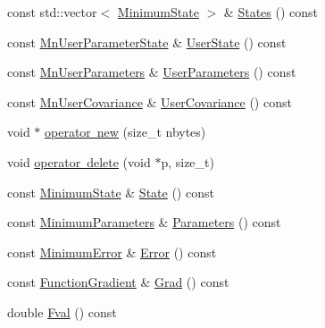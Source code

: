 \begin{DoxyCompactItemize}
\item 
const std\+::vector$<$ \mbox{\hyperlink{classROOT_1_1Minuit2_1_1MinimumState}{Minimum\+State}} $>$ \& \mbox{\hyperlink{classROOT_1_1Minuit2_1_1BasicFunctionMinimum_a89080776340dc1cad0d73357a6c4b401}{States}} () const
\item 
const \mbox{\hyperlink{classROOT_1_1Minuit2_1_1MnUserParameterState}{Mn\+User\+Parameter\+State}} \& \mbox{\hyperlink{classROOT_1_1Minuit2_1_1BasicFunctionMinimum_ac1757a094afe32c23b548fafaff5acc1}{User\+State}} () const
\item 
const \mbox{\hyperlink{classROOT_1_1Minuit2_1_1MnUserParameters}{Mn\+User\+Parameters}} \& \mbox{\hyperlink{classROOT_1_1Minuit2_1_1BasicFunctionMinimum_aa6fa4f1678939015849b6a2ab6023238}{User\+Parameters}} () const
\item 
const \mbox{\hyperlink{classROOT_1_1Minuit2_1_1MnUserCovariance}{Mn\+User\+Covariance}} \& \mbox{\hyperlink{classROOT_1_1Minuit2_1_1BasicFunctionMinimum_a4f06adfe70411becfe7aa48f6bce1f22}{User\+Covariance}} () const
\item 
void $\ast$ \mbox{\hyperlink{classROOT_1_1Minuit2_1_1BasicFunctionMinimum_a49a32bdb3ff21202fcfa9a9e42015b8f}{operator new}} (size\+\_\+t nbytes)
\item 
void \mbox{\hyperlink{classROOT_1_1Minuit2_1_1BasicFunctionMinimum_ab9d53fd0c21ac6456afdb233e4cbaf1b}{operator delete}} (void $\ast$p, size\+\_\+t)
\item 
const \mbox{\hyperlink{classROOT_1_1Minuit2_1_1MinimumState}{Minimum\+State}} \& \mbox{\hyperlink{classROOT_1_1Minuit2_1_1BasicFunctionMinimum_a57c7f1a6d3551fd329698e0fc9424fec}{State}} () const
\item 
const \mbox{\hyperlink{classROOT_1_1Minuit2_1_1MinimumParameters}{Minimum\+Parameters}} \& \mbox{\hyperlink{classROOT_1_1Minuit2_1_1BasicFunctionMinimum_acbbd51950f390d29541728f114b2d12e}{Parameters}} () const
\item 
const \mbox{\hyperlink{classROOT_1_1Minuit2_1_1MinimumError}{Minimum\+Error}} \& \mbox{\hyperlink{classROOT_1_1Minuit2_1_1BasicFunctionMinimum_a239c3ed3af4e3bc89b25014ec808e229}{Error}} () const
\item 
const \mbox{\hyperlink{classROOT_1_1Minuit2_1_1FunctionGradient}{Function\+Gradient}} \& \mbox{\hyperlink{classROOT_1_1Minuit2_1_1BasicFunctionMinimum_aa071637493e0d415db455c2eec0990c6}{Grad}} () const
\item 
double \mbox{\hyperlink{classROOT_1_1Minuit2_1_1BasicFunctionMinimum_a4ae5abf5eb1cfa1924abad45529e1ffd}{Fval}} () const

\end{DoxyCompactItemize}
